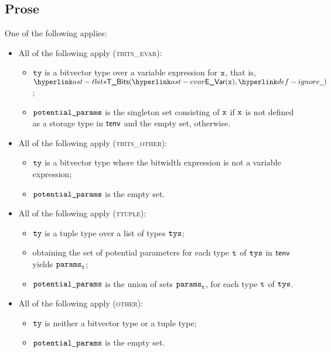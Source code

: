\subsection{Prose}
One of the following applies:
\begin{itemize}
  \item All of the following apply (\textsc{tbits\_evar}):
  \begin{itemize}
    \item $\texttt{ty}$ is a bitvector type over a variable expression for $\texttt{x}$, that is, \\ $\TBits(\EVar(\vx), \Ignore)$;
    \item $\texttt{potential\_params}$ is the singleton set consisting of $\texttt{x}$ if $\texttt{x}$ is not defined as a storage type in $\textsf{tenv}$
          and the empty set, otherwise.
  \end{itemize}

  \item All of the following apply (\textsc{tbits\_other}):
  \begin{itemize}
    \item $\texttt{ty}$ is a bitvector type where the bitwidth expression is not a variable expression;
    \item $\texttt{potential\_params}$ is the empty set.
  \end{itemize}

  \item All of the following apply (\textsc{ttuple}):
  \begin{itemize}
    \item $\texttt{ty}$ is a tuple type over a list of types $\texttt{tys}$;
    \item obtaining the set of potential parameters for each type $\texttt{t}$ of $\texttt{tys}$ in $\textsf{tenv}$ yields $\texttt{params}_{\texttt{t}}$;
    \item $\texttt{potential\_params}$ is the union of sets $\texttt{params}_{\texttt{t}}$, for each type $\texttt{t}$ of $\texttt{tys}$.
  \end{itemize}

  \item All of the following apply (\textsc{other}):
  \begin{itemize}
    \item $\texttt{ty}$ is neither a bitvector type or a tuple type;
    \item $\texttt{potential\_params}$ is the empty set.
  \end{itemize}
\end{itemize}


